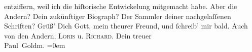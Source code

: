 \begin{ledgroupsized}[t]{13cm}
               entziffern, weil ich die hiſtorische Entwickelung mitgemacht habe. Aber die Andern?
               Dein zukünftiger Biograph? Der Sammler deiner nachgelaſſenen Schriften? {\dotsfour}\pend
           \pstart
           Grüß’ Dich Gott, mein theurer Freund, und ſchreib’ mir bald. Auch von den Andern, \textsc{Loris} u. \textsc{Richard}.\pend
           \pstart
           Dein treuer {\\[\baselineskip]}\spacefill\mbox{Paul Goldm.}\pend
           \leftskip=0em{}
         
         \endnumbering{}\end{ledgroupsized}  \newcommand{\dateiname}{L02619}\newcommand{\titel}{Paul Goldmann an Arthur Schnitzler, 1. 5. [1894]}\newcommand{\editorInnen}{Martin Anton Müller und Laura Untner}
      